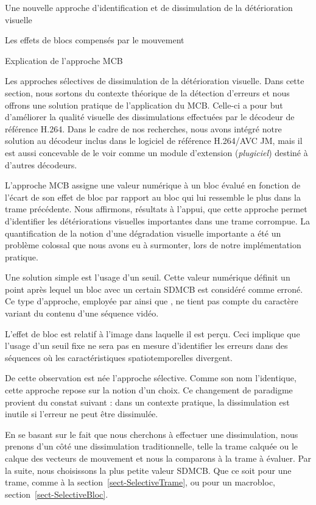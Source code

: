 \documentclass[letterpaper, twoside, 12pt,memoire]{thETS}
\newcommand{\SC}[1]{%
	{
	\todo[inline,color={red!100!green!33!}]{%
	\textbf{[SC]:}~#1}
	}}
\newcommand{\ltCodec}{logiciel de référence H.264/AVC JM}
\providecommand{\DIFaddbegin}{} %
\providecommand{\DIFaddend}{} %
\begin{document}
\begin{chapter}{Une nouvelle approche d'identification et de dissimulation de la
détérioration visuelle}
\begin{section}{Les effets de blocs compensés par le mouvement}
\begin{subsection}{Explication de l'approche MCB}
\DIFaddend \end{subsection}

\end{section}

\begin{section}{Les approches sélectives de dissimulation de la détérioration
visuelle.}
\label{sect-Selectives}
Dans cette section, nous sortons du contexte théorique de la détection d'erreurs
et nous offrons une solution pratique de l'application du MCB. Celle-ci a pour
but d'améliorer la qualité visuelle des dissimulations effectuées par le
décodeur de référence H.264. Dans le cadre de nos recherches, nous avons intégré
notre solution au décodeur inclus dans le \ltCodec, mais il est aussi concevable
de le voir comme un module d'extension (\textit{plugiciel}) destiné à d'autres
décodeurs.

L'approche MCB assigne une valeur numérique à un bloc évalué en fonction de
l'écart de son effet de bloc par rapport au bloc qui lui ressemble le plus dans
la trame précédente. Nous affirmons, résultats à l'appui, que cette approche permet d'identifier les
détériorations visuelles importantes dans une trame corrompue. La quantification de
la notion d'une dégradation visuelle importante a été un problème colossal que
nous avons eu à surmonter, lors de notre implémentation pratique.

Une solution simple est l'usage d'un seuil. Cette valeur numérique définit un
point après lequel un bloc avec un certain SDMCB est considéré comme erroné. Ce
type d'approche, employée par \citet{Superiori2007} ainsi que \citet{Ikuno2007},
ne tient pas compte du caractère variant du contenu d'une séquence vidéo.

L'effet de bloc est relatif à l'image dans laquelle il est perçu. Ceci implique
que l'usage d'un seuil fixe ne sera pas en mesure d'identifier les erreurs dans
des séquences où les caractéristiques spatiotemporelles divergent.

De cette observation est née l'approche sélective. Comme son nom l'identique,
cette approche repose sur la notion d'un choix. Ce changement de paradigme
provient du constat suivant : dans un contexte pratique, la dissimulation
est inutile si l'erreur ne peut être dissimulée.
\DIFaddbegin \SC{Phrase bizarre. la détection est inutile?}
\DIFaddend 

En se basant sur le fait que nous cherchons à effectuer une dissimulation, nous
prenons d'un côté une dissimulation traditionnelle, telle la trame calquée ou le
calque des vecteurs de mouvement et nous la comparons à la trame à évaluer. Par
la suite, nous choisissons la plus petite valeur SDMCB. Que ce soit pour une
trame, comme à la section~\ref{sect-SelectiveTrame}, ou pour un macrobloc,
section~\ref{sect-SelectiveBloc}.


\end{section}
\end{chapter}
\end{document}

